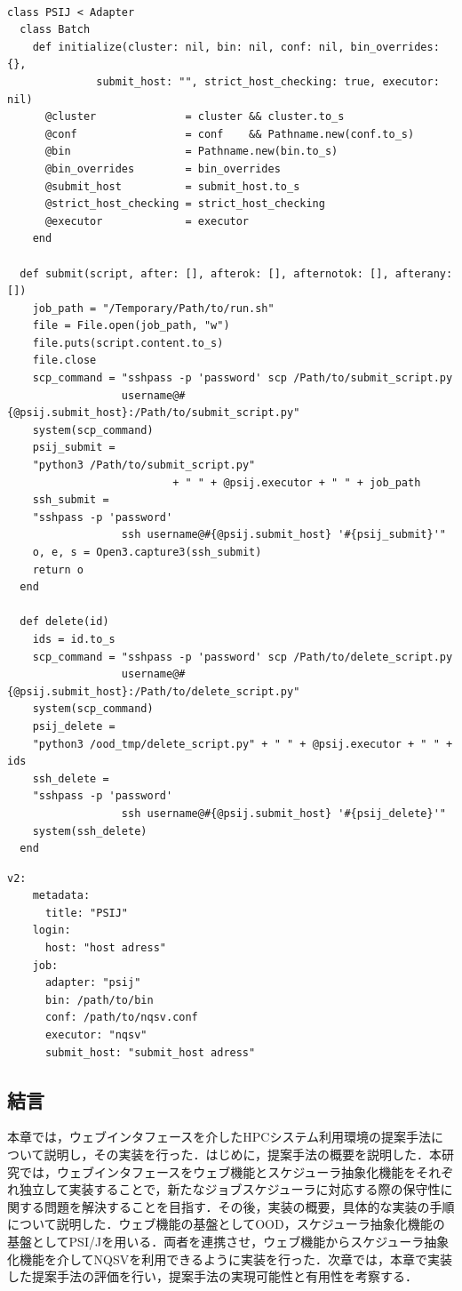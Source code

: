 \begin{lstlisting}[caption=PSI/JとOODの連携, label=psij_to_ood]

class PSIJ < Adapter
  class Batch
    def initialize(cluster: nil, bin: nil, conf: nil, bin_overrides: {}, 
              submit_host: "", strict_host_checking: true, executor: nil)
      @cluster              = cluster && cluster.to_s
      @conf                 = conf    && Pathname.new(conf.to_s)
      @bin                  = Pathname.new(bin.to_s)
      @bin_overrides        = bin_overrides
      @submit_host          = submit_host.to_s
      @strict_host_checking = strict_host_checking
      @executor             = executor
    end

  def submit(script, after: [], afterok: [], afternotok: [], afterany: [])
    job_path = "/Temporary/Path/to/run.sh" 
    file = File.open(job_path, "w")
    file.puts(script.content.to_s)
    file.close
    scp_command = "sshpass -p 'password' scp /Path/to/submit_script.py 
                  username@#{@psij.submit_host}:/Path/to/submit_script.py"
    system(scp_command)
    psij_submit = 
    "python3 /Path/to/submit_script.py" 
                          + " " + @psij.executor + " " + job_path
    ssh_submit = 
    "sshpass -p 'password' 
                  ssh username@#{@psij.submit_host} '#{psij_submit}'"
    o, e, s = Open3.capture3(ssh_submit)
    return o
  end
  
  def delete(id)
    ids = id.to_s
    scp_command = "sshpass -p 'password' scp /Path/to/delete_script.py 
                  username@#{@psij.submit_host}:/Path/to/delete_script.py"
    system(scp_command)
    psij_delete = 
    "python3 /ood_tmp/delete_script.py" + " " + @psij.executor + " " + ids
    ssh_delete = 
    "sshpass -p 'password' 
                  ssh username@#{@psij.submit_host} '#{psij_delete}'"
    system(ssh_delete)
  end

\end{lstlisting}

\begin{lstlisting}[caption=OODとPSI/Jの接続ファイル, label=config_file]
v2:
    metadata:
      title: "PSIJ"
    login:
      host: "host adress"
    job:
      adapter: "psij"
      bin: /path/to/bin
      conf: /path/to/nqsv.conf
      executor: "nqsv"
      submit_host: "submit_host adress"
\end{lstlisting}

\subsection{結言}
本章では，ウェブインタフェースを介したHPCシステム利用環境の提案手法について説明し，その実装を行った．はじめに，提案手法の概要を説明した．本研究では，ウェブインタフェースをウェブ機能とスケジューラ抽象化機能をそれぞれ独立して実装することで，新たなジョブスケジューラに対応する際の保守性に関する問題を解決することを目指す．その後，実装の概要，具体的な実装の手順について説明した．ウェブ機能の基盤としてOOD，スケジューラ抽象化機能の基盤としてPSI/Jを用いる．両者を連携させ，ウェブ機能からスケジューラ抽象化機能を介してNQSVを利用できるように実装を行った．次章では，本章で実装した提案手法の評価を行い，提案手法の実現可能性と有用性を考察する．